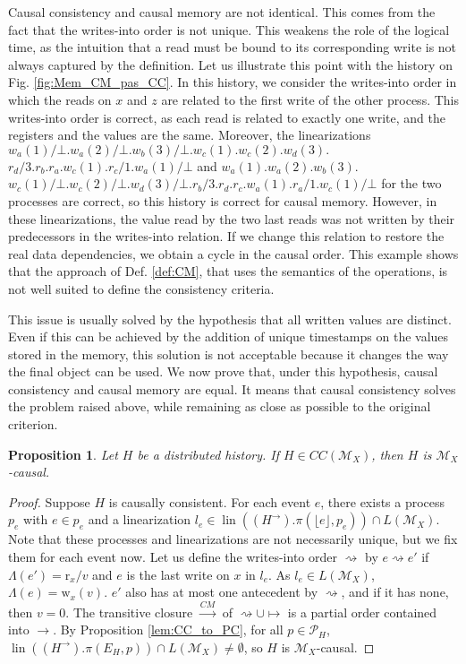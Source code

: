\documentclass[9pt,numbers]{sigplanconf}
\newtheorem{proposition}{Proposition}
\DeclareMathOperator{\lin}{lin}
\begin{document}
Causal consistency and causal memory are not identical. 
This comes from the fact that the writes-into order is not unique.
This weakens the role of the logical time, as the intuition that a read must be bound to its 
corresponding write is not always captured by the definition.
Let us illustrate this point with the history on Fig. \ref{fig:Mem_CM_pas_CC}.
In this history, we consider the writes-into order in which the reads on $x$ and $z$ 
are related to the first write of the other process. This writes-into order is correct,
as each read is related to exactly one write, and the registers and the values are the same. Moreover, 
the linearizations $w_a(1)/\bot.w_a(2)/\bot.w_b(3)/\bot.w_c(1).w_c(2).w_d(3).$\linebreak $r_d/3.r_b.r_a.w_c(1).r_c/1.w_a(1)/\bot$
and $w_a(1).w_a(2).w_b(3).$\linebreak $w_c(1)/\bot.w_c(2)/\bot.w_d(3)/\bot.r_b/3.r_d.r_c.w_a(1).r_a/1.w_c(1)/\bot$ for the two processes
are correct, so this history is correct for causal memory.
However, in these linearizations, the value read by the two last reads was not written by their predecessors 
in the writes-into relation. If we change this relation to restore the real data dependencies, we obtain a cycle
in the causal order. This example shows that the approach of Def. \ref{def:CM}, that uses the semantics of the operations,
is not well suited to define the consistency criteria. 

This issue is usually solved \cite{misra1986axioms} by the hypothesis that all written values are distinct.
Even if this can be achieved by the addition of unique timestamps on the values stored in the memory, this solution 
is not acceptable because it changes the way the final object can be used. We now prove that, under this hypothesis,
causal consistency and causal memory are equal. It means that causal consistency solves the problem raised above,
while remaining as close as possible to the original criterion.

\begin{proposition}
  Let $H$ be a distributed history.  If $H \in CC(\mathcal{M}_X)$, then $H$ is $\mathcal{M}_X$-causal.
\end{proposition}
\begin{proof}
  Suppose $H$ is causally consistent. For each event $e$, there exists a process $p_e$ with $e\in p_e$ 
  and a linearization $l_e \in \lin((H^\rightarrow).\pi(\lfloor e\rfloor, p_e))\cap L(\mathcal{M}_X)$.
  Note that these processes and linearizations are not necessarily unique, but we fix them for each event now. 
  Let us define the writes-into order $\rightsquigarrow$ by $e\rightsquigarrow e'$ if $\Lambda(e') = \mathrm{r}_x/v$
  and $e$ is the last write on $x$ in $l_e$. As $l_e\in L(\mathcal{M}_X)$, $\Lambda(e) = \mathrm{w}_x(v)$.
  $e'$ also has at most one antecedent by $\rightsquigarrow$, and if it has none, then $v=0$. 
  The transitive closure $\xrightarrow{CM}$ of $\rightsquigarrow \cup \mapsto$ is a partial order contained into
  $\rightarrow$. By Proposition \ref{lem:CC_to_PC}, for all $p\in \mathscr{P}_H$,
  $\lin\left((H^\rightarrow).\pi(E_H, p)\right) \cap L(\mathcal{M}_X) \neq \emptyset$, so  
  $H$ is $\mathcal{M}_X$-causal.
\end{proof}
\end{document}
